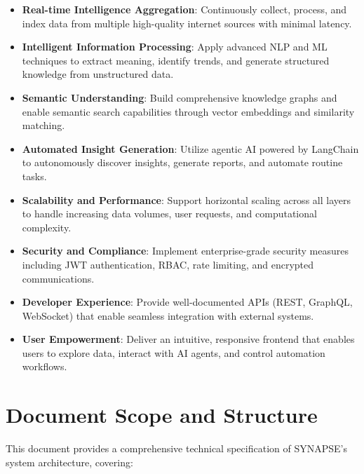 \documentclass[12pt,a4paper]{report}
\begin{document}
\begin{itemize}[label=\textbullet]
    \item \textbf{Real-time Intelligence Aggregation}: Continuously collect, process, and index data from multiple high-quality internet sources with minimal latency.
    
    \item \textbf{Intelligent Information Processing}: Apply advanced NLP and ML techniques to extract meaning, identify trends, and generate structured knowledge from unstructured data.
    
    \item \textbf{Semantic Understanding}: Build comprehensive knowledge graphs and enable semantic search capabilities through vector embeddings and similarity matching.
    
    \item \textbf{Automated Insight Generation}: Utilize agentic AI powered by LangChain to autonomously discover insights, generate reports, and automate routine tasks.
    
    \item \textbf{Scalability and Performance}: Support horizontal scaling across all layers to handle increasing data volumes, user requests, and computational complexity.
    
    \item \textbf{Security and Compliance}: Implement enterprise-grade security measures including JWT authentication, RBAC, rate limiting, and encrypted communications.
    
    \item \textbf{Developer Experience}: Provide well-documented APIs (REST, GraphQL, WebSocket) that enable seamless integration with external systems.
    
    \item \textbf{User Empowerment}: Deliver an intuitive, responsive frontend that enables users to explore data, interact with AI agents, and control automation workflows.
\end{itemize}

\section{Document Scope and Structure}

This document provides a comprehensive technical specification of SYNAPSE's system architecture, covering:
\end{document}
